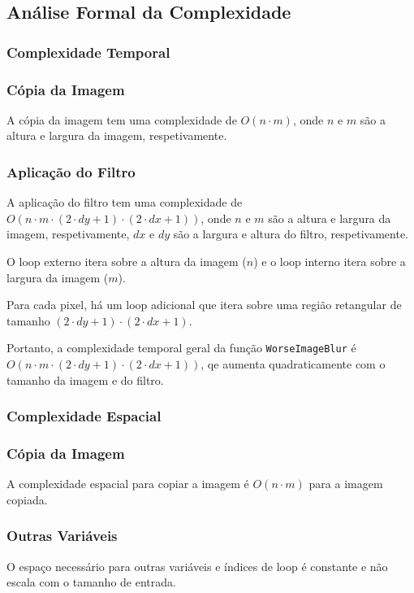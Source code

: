 \documentclass{report}
\begin{document}
\subsection{Análise Formal da Complexidade}

\subsubsection{Complexidade Temporal}

\subsubsection{Cópia da Imagem}
A cópia da imagem tem uma complexidade de \(O(n \cdot m)\), onde \(n\) e \(m\) são a altura e largura da imagem, respetivamente.

\subsubsection{Aplicação do Filtro}
A aplicação do filtro tem uma complexidade de \(O(n \cdot m \cdot (2 \cdot dy + 1) \cdot (2 \cdot dx + 1))\), 
onde \(n\) e \(m\) são a altura e largura da imagem, respetivamente, 
\(dx\) e \(dy\) são a largura e altura do filtro, respetivamente.
\par
O loop externo itera sobre a altura da imagem (\(n\)) e o loop interno itera sobre a largura da imagem (\(m\)).
\par
Para cada pixel, há um loop adicional que itera sobre uma região retangular de tamanho \((2 \cdot dy + 1) \cdot (2 \cdot dx + 1)\).
\par
Portanto, a complexidade temporal geral da função \texttt{WorseImageBlur} é \(O(n \cdot m \cdot (2 \cdot dy + 1) \cdot (2 \cdot dx + 1))\), 
qe aumenta quadraticamente com o tamanho da imagem e do filtro.


\subsubsection{Complexidade Espacial}

\subsubsection{Cópia da Imagem}
A complexidade espacial para copiar a imagem é \(O(n \cdot m)\) para a imagem copiada.

\subsubsection{Outras Variáveis}
O espaço necessário para outras variáveis e índices de loop é constante e não escala com o tamanho de entrada.
\end{document}
